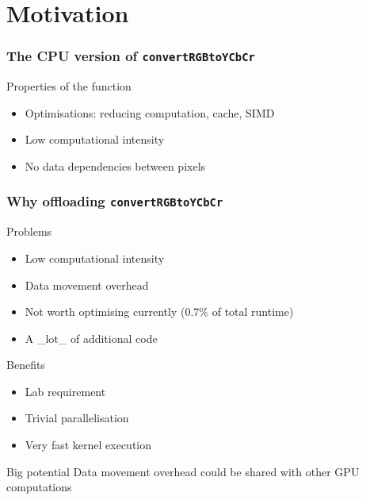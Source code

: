 \section{Motivation}
\begin{frame}[fragile]
  \frametitle{The CPU version of \lstinline{convertRGBtoYCbCr}}
   \pause{}
  \begin{alertblock}{Properties of the function}
    \begin{itemize}
    \item Optimisations: reducing computation, cache, SIMD
    \item Low computational intensity
    \item No data dependencies between pixels
    \end{itemize}
  \end{alertblock}
\end{frame}

\begin{frame}
  \frametitle{Why offloading \lstinline{convertRGBtoYCbCr}}
  \pause{}
  \begin{block}{Problems}
    \begin{itemize}
    \item Low computational intensity
    \item Data movement overhead
    \item Not worth optimising currently (\(0.7\%\) of total runtime)
    \item A \_lot\_ of additional code
    \end{itemize}
  \end{block}
  \pause{}
  \begin{block}{Benefits}
    \begin{itemize}
    \item Lab requirement
    \item Trivial parallelisation
    \item Very fast kernel execution
    \end{itemize}
  \end{block}
  \pause{}
  \begin{alertblock}{Big potential}
    Data movement overhead could be shared with other GPU computations
  \end{alertblock}
\end{frame}

